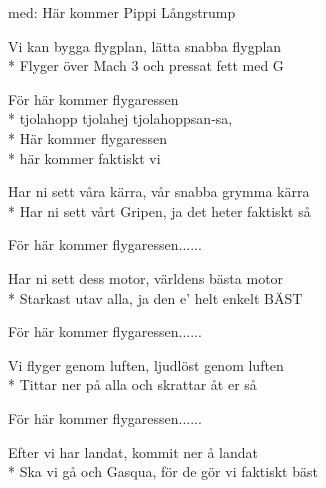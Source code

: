 \begin{SongText}
    \begin{SongInfo}
        med: Här kommer Pippi Långstrump
    \end{SongInfo}
    \begin{SongVerse}
        Vi kan bygga flygplan, lätta snabba flygplan\\*%
        Flyger över Mach 3 och pressat fett med G
    \end{SongVerse}
    \begin{SongVerse}
        För här kommer flygaressen\\*%
        tjolahopp tjolahej tjolahoppsan-sa,\\*%
        Här kommer flygaressen\\*%
        här kommer faktiskt vi
    \end{SongVerse}
    \begin{SongVerse}
        Har ni sett våra kärra, vår snabba grymma kärra\\*%
        Har ni sett vårt Gripen, ja det heter faktiskt så
    \end{SongVerse}
    \begin{SongVerse}
        För här kommer flygaressen......
    \end{SongVerse}
    \begin{SongVerse}
        Har ni sett dess motor, världens bästa motor\\*%
        Starkast utav alla, ja den e' helt enkelt BÄST
    \end{SongVerse}
    \begin{SongVerse}
        För här kommer flygaressen......
    \end{SongVerse}
    \begin{SongVerse}
        Vi flyger genom luften, ljudlöst genom luften\\*%
        Tittar ner på alla och skrattar åt er så
    \end{SongVerse}
    \begin{SongVerse}
        För här kommer flygaressen......
    \end{SongVerse}
    \begin{SongVerse}
        Efter vi har landat, kommit ner å landat\\*%
        Ska vi gå och Gasqua, för de gör vi faktiskt bäst
    \end{SongVerse}
    \begin{SongVerse}

\end{SongVerse}
\end{SongText}

